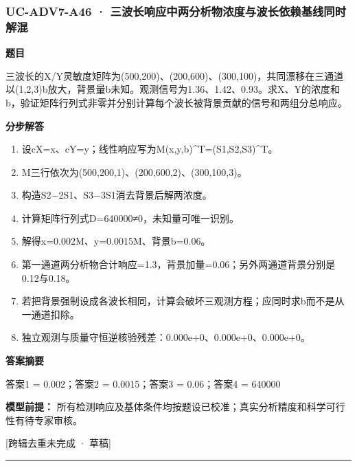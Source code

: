 \documentclass[UTF8,11pt,a4paper]{ctexart}
\begin{document}
\subsubsection*{UC-ADV7-A46 · 三波长响应中两分析物浓度与波长依赖基线同时解混}
\noindent\textbf{题目}\par
三波长的X/Y灵敏度矩阵为(500,200)、(200,600)、(300,100)，共同漂移在三通道以(1,2,3)b放大，背景量b未知。观测信号为1.36、1.42、0.93。求X、Y的浓度和b，验证矩阵行列式非零并分别计算每个波长被背景贡献的信号和两组分总响应。\par
\medskip\noindent\textbf{分步解答}
\begin{enumerate}
\item 设cX=x、cY=y；线性响应写为M(x,y,b)\textasciicircum{}T=(S1,S2,S3)\textasciicircum{}T。
\item M三行依次为(500,200,1)、(200,600,2)、(300,100,3)。
\item 构造S2−2S1、S3−3S1消去背景后解两浓度。
\item 计算矩阵行列式D=640000≠0，未知量可唯一识别。
\item 解得x=0.002M、y=0.0015M、背景b=0.06。
\item 第一通道两分析物合计响应=1.3，背景加量=0.06；另外两通道背景分别是0.12与0.18。
\item 若把背景强制设成各波长相同，计算会破坏三观测方程；应同时求b而不是从一通道扣除。
\item 独立观测与质量守恒逆核验残差：0.000e+0、0.000e+0、0.000e+0。
\end{enumerate}
\noindent\textbf{答案摘要}\par
答案1 = 0.002；答案2 = 0.0015；答案3 = 0.06；答案4 = 640000\par
\noindent\textbf{模型前提：}
所有检测响应及基体条件均按题设已校准；真实分析精度和科学可行性有待专家审核。\par
\noindent\textcolor{red!65!black}{[跨辑去重未完成 · 草稿]} \par
\medskip\hrule\medskip
{}
\end{document}
